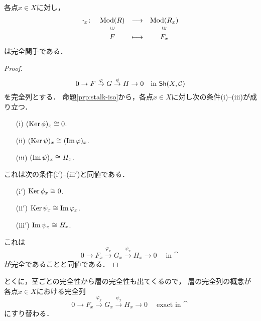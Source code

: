 \begin{PRP}[茎は完全]
    各点$x\in X$に対し，
    \begin{equation*}
        \begin{array}{rccc}
            {\boldsymbol{\cdot}}_x\colon&\Mod(R)&\longrightarrow&\Mod(R_x)\\
            &\rotatebox{90}{$\in$}&&\rotatebox{90}{$\in$}\\
            &F&\longmapsto&F_x        
        \end{array}
    \end{equation*}
    は完全関手である．    
\end{PRP}
\begin{proof}
    \begin{equation*}
        0\to F\overset{\varphi}{\to} 
        G\overset{\psi}{\to}H\to 0
        \quad\text{in $\mathop{\textsf{Sh}}\nolimits(X,\mathcal{C})$}
    \end{equation*}
    を完全列とする．
    命題\ref{prp:stalk-iso}から，各点$x\in X$に対し次の条件(i)--(iii)が成り立つ．
    \begin{enumerate}
        \item [(i)]     $(\mathop{\mathrm{Ker}}\nolimits\phi)_x\cong0$.
        \item [(ii)]    $(\mathop{\mathrm{Ker}}\nolimits\psi)_x\cong(\mathop{\mathrm{Im}}\nolimits\varphi)_x$.
        \item [(iii)]   $(\mathop{\mathrm{Im}}\nolimits\psi)_x\cong H_x$.
    \end{enumerate}
    これは次の条件($\mathrm{i}'$)--($\mathrm{iii}'$)と同値である．
    \begin{enumerate}
        \item [($\mathrm{i}'$)]     $\mathop{\mathrm{Ker}}\nolimits\phi_x\cong0$.
        \item [($\mathrm{ii}'$)]    $\mathop{\mathrm{Ker}}\nolimits\psi_x\cong\mathop{\mathrm{Im}}\nolimits\varphi_x$.
        \item [($\mathrm{iii}'$)]   $\mathop{\mathrm{Im}}\nolimits\psi_x\cong H_x$.
    \end{enumerate}
    これは
    \begin{equation*}
        0\to F_x\overset{\varphi_x}{\longrightarrow} 
        G_x\overset{\psi_x}{\longrightarrow}H_x\to 0
        \quad\text{in $\cat$}
    \end{equation*}
    が完全であることと同値である．    
\end{proof}
とくに，茎ごとの完全性から層の完全性も出てくるので，
層の完全列の概念が各点$x\in X$における完全列
\begin{equation*}
    0\to F_x\overset{\varphi_x}{\longrightarrow} 
    G_x\overset{\psi_x}{\longrightarrow}H_x\to 0
    \quad\text{exact in $\cat$}
\end{equation*}
にすり替わる．


